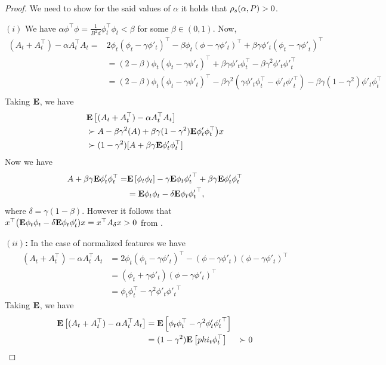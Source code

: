 \thtdadmis*
\begin{proof}
We need to show for the said values of $\alpha$ it holds that $\rho_s(\alpha,P)>0$. %

\textbf{$(i)$}   We have $\alpha\phi^\top\phi=\frac{1}{B^2d}\phi^\top_t\phi_t<\beta$ for some $\beta\in (0,1)$. Now, 
\begin{align*}
(A_t+A_t^\top) -\alpha A_t^\top A_t =& 2\phi_t(\phi_t-\gamma\phi'_t)^\top -\beta\phi_t(\phi-\gamma\phi'_t)^\top+\beta\gamma\phi'_t(\phi_t-\gamma{\phi'}_t)^\top\\
&= (2-\beta)\phi_t(\phi_t-\gamma\phi'_t)^\top +\beta\gamma\phi'_t\phi^\top_t-\beta\gamma^2\phi'_t{\phi'}_t^\top \\
&= (2-\beta)\phi_t(\phi_t-\gamma\phi'_t)^\top -\beta\gamma^2(\gamma\phi'_t\phi^\top_t- \phi'_t{\phi'}_t^\top)-\beta\gamma(1-\gamma^2)\phi'_t\phi_t^\top\\
\end{align*}
Taking $\mathbf{E}$, we have
\begin{align*}
&\mathbf{E}\left[ (A_t+A_t^\top)-\alpha A_t^\top A_t\right]\\
&\succ  A -\beta\gamma^2(A)+\beta\gamma(1-\gamma^2)\mathbf{E}{\phi'_t\phi_t^\top} \big)x\\
&\succ (1-\gamma^2)[A +\beta\gamma\mathbf{E}{\phi'_t\phi_t^\top}]
\end{align*}
Now we have 
\begin{align*}
A +\beta\gamma\mathbf{E}{\phi'_t\phi_t^\top}=& \mathbf{E}\left[\phi_t\phi_t\right]-\gamma\mathbf{E}{\phi_t{\phi'_t}^\top} +\beta\gamma\mathbf{E}{\phi'_t\phi_t^\top}\\
&=\mathbf{E}{\phi_t\phi_t}-\delta\mathbf{E}{\phi_t{\phi'_t}^\top},
\end{align*}
where $\delta=\gamma(1-\beta)$. However it follows that $x^\top\big(\mathbf{E}{\phi_t\phi_t}-\delta\mathbf{E}{\phi_t\phi'_t} )x=x^\top A_{\delta} x>0$ from .

\textbf{$(ii)$:}
In the case of normalized features we have
\begin{align*}
(A_t+A_t^\top) -\alpha A_t^\top A_t &= 2\phi_t(\phi_t-\gamma\phi'_t)^\top - (\phi-\gamma\phi'_t)(\phi-\gamma\phi'_t)^\top\\
&=(\phi_t+\gamma\phi'_t)(\phi-\gamma\phi'_t)^\top\\
&=\phi_t\phi_t^\top-\gamma^2\phi'_t{\phi'_t}^\top
\end{align*}
Taking $\mathbf{E}$, we have
\begin{align*}
\mathbf{E}\left[(A_t+A_t^\top) -\alpha A_t^\top A_t \right]&=\mathbf{E}\left[\phi_t\phi_t^\top-\gamma^2\phi'_t{\phi'_t}^\top\right]\\
&=(1-\gamma^2)\mathbf{E}\left[phi_t\phi_t^\top\right]
&\succ 0
\end{align*}


\end{proof}
